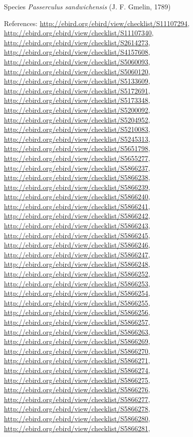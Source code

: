 \documentclass[9pt, article]{memoir}
\begin{document}
\begin{multicols}{2}
\vspace{6pt}\noindent\hspace{36pt}Species \textit{Passerculus sandwichensis} (J. F. Gmelin, 1789)


\vspace{6pt}References: 
\url{http://ebird.org/ebird/view/checklist/S11107294}, 
\url{http://ebird.org/ebird/view/checklist/S11107340}, 
\url{http://ebird.org/ebird/view/checklist/S2614273}, 
\url{http://ebird.org/ebird/view/checklist/S4157608}, 
\url{http://ebird.org/ebird/view/checklist/S5060093}, 
\url{http://ebird.org/ebird/view/checklist/S5060120}, 
\url{http://ebird.org/ebird/view/checklist/S5133609}, 
\url{http://ebird.org/ebird/view/checklist/S5172691}, 
\url{http://ebird.org/ebird/view/checklist/S5173348}, 
\url{http://ebird.org/ebird/view/checklist/S5200092}, 
\url{http://ebird.org/ebird/view/checklist/S5204952}, 
\url{http://ebird.org/ebird/view/checklist/S5210083}, 
\url{http://ebird.org/ebird/view/checklist/S5245313}, 
\url{http://ebird.org/ebird/view/checklist/S5651798}, 
\url{http://ebird.org/ebird/view/checklist/S5655277}, 
\url{http://ebird.org/ebird/view/checklist/S5866237}, 
\url{http://ebird.org/ebird/view/checklist/S5866238}, 
\url{http://ebird.org/ebird/view/checklist/S5866239}, 
\url{http://ebird.org/ebird/view/checklist/S5866240}, 
\url{http://ebird.org/ebird/view/checklist/S5866241}, 
\url{http://ebird.org/ebird/view/checklist/S5866242}, 
\url{http://ebird.org/ebird/view/checklist/S5866243}, 
\url{http://ebird.org/ebird/view/checklist/S5866245}, 
\url{http://ebird.org/ebird/view/checklist/S5866246}, 
\url{http://ebird.org/ebird/view/checklist/S5866247}, 
\url{http://ebird.org/ebird/view/checklist/S5866248}, 
\url{http://ebird.org/ebird/view/checklist/S5866252}, 
\url{http://ebird.org/ebird/view/checklist/S5866253}, 
\url{http://ebird.org/ebird/view/checklist/S5866254}, 
\url{http://ebird.org/ebird/view/checklist/S5866255}, 
\url{http://ebird.org/ebird/view/checklist/S5866256}, 
\url{http://ebird.org/ebird/view/checklist/S5866257}, 
\url{http://ebird.org/ebird/view/checklist/S5866263}, 
\url{http://ebird.org/ebird/view/checklist/S5866269}, 
\url{http://ebird.org/ebird/view/checklist/S5866270}, 
\url{http://ebird.org/ebird/view/checklist/S5866271}, 
\url{http://ebird.org/ebird/view/checklist/S5866274}, 
\url{http://ebird.org/ebird/view/checklist/S5866275}, 
\url{http://ebird.org/ebird/view/checklist/S5866276}, 
\url{http://ebird.org/ebird/view/checklist/S5866277}, 
\url{http://ebird.org/ebird/view/checklist/S5866278}, 
\url{http://ebird.org/ebird/view/checklist/S5866280}, 
\url{http://ebird.org/ebird/view/checklist/S5866281}, 

\end{multicols}
\end{document}
